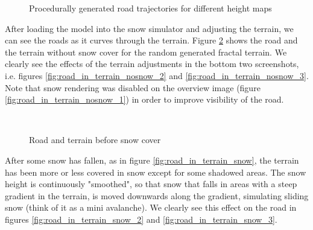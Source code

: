 \begin{figure}[H]
\caption{Procedurally generated road trajectories for different height maps}
\label{fig:road_trajectory}
\end{figure}

After loading the model into the snow simulator and adjusting the terrain, we can see the roads as it curves through the terrain. Figure \ref{fig:road_in_terrain_nosnow} shows the road and the terrain without snow cover for the random generated fractal terrain. We clearly see the effects of the terrain adjustments in the bottom two screenshots, i.e. figures \ref{fig:road_in_terrain_nosnow_2} and \ref{fig:road_in_terrain_nosnow_3}. Note that snow rendering was disabled on the overview image (figure \ref{fig:road_in_terrain_nosnow_1}) in order to improve visibility of the road. 

\begin{figure}[ht]
\centering
{}\\
\quad
{}
\caption{Road and terrain before snow cover}
\label{fig:road_in_terrain_nosnow}
\end{figure}

After some snow has fallen, as in figure \ref{fig:road_in_terrain_snow}, the terrain has been more or less covered in snow except for some shadowed areas. The snow height is continuously "smoothed", so that snow that falls in areas with a steep gradient in the terrain, is moved downwards along the gradient, simulating sliding snow (think of it as a mini avalanche). We clearly see this effect on the road in figures \ref{fig:road_in_terrain_snow_2} and \ref{fig:road_in_terrain_snow_3}.

